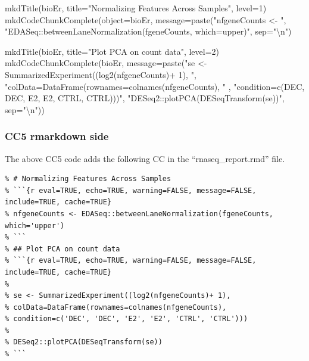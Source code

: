 \documentclass[
]{article}
\newenvironment{Shaded}{\begin{snugshade}}{\end{snugshade}}
\newcommand{\AttributeTok}[1]{\textcolor[rgb]{0.77,0.63,0.00}{#1}}
\newcommand{\DecValTok}[1]{\textcolor[rgb]{0.00,0.00,0.81}{#1}}
\newcommand{\FunctionTok}[1]{\textcolor[rgb]{0.00,0.00,0.00}{#1}}
\newcommand{\NormalTok}[1]{#1}
\newcommand{\SpecialCharTok}[1]{\textcolor[rgb]{0.00,0.00,0.00}{#1}}
\newcommand{\StringTok}[1]{\textcolor[rgb]{0.31,0.60,0.02}{#1}}
\begin{document}
\begin{Shaded}
\begin{Highlighting}[]
\FunctionTok{mkdTitle}\NormalTok{(bioEr, }\AttributeTok{title=}\StringTok{"Normalizing Features Across Samples"}\NormalTok{, }\AttributeTok{level=}\DecValTok{1}\NormalTok{)}
\FunctionTok{mkdCodeChunkComplete}\NormalTok{(}\AttributeTok{object=}\NormalTok{bioEr, }\AttributeTok{message=}\FunctionTok{paste}\NormalTok{(}\StringTok{"nfgeneCounts \textless{}{-} "}\NormalTok{,}
              \StringTok{"EDASeq::betweenLaneNormalization(fgeneCounts, which=\textquotesingle{}upper\textquotesingle{})"}\NormalTok{, }\AttributeTok{sep=}\StringTok{"}\SpecialCharTok{\textbackslash{}n}\StringTok{"}\NormalTok{)}

\FunctionTok{mkdTitle}\NormalTok{(bioEr, }\AttributeTok{title=}\StringTok{"Plot PCA on count data"}\NormalTok{, }\AttributeTok{level=}\DecValTok{2}\NormalTok{)}
\FunctionTok{mkdCodeChunkComplete}\NormalTok{(bioEr, }\AttributeTok{message=}\FunctionTok{paste}\NormalTok{(}\StringTok{"se \textless{}{-} SummarizedExperiment((log2(nfgeneCounts)+ 1), "}\NormalTok{,}
                \StringTok{"colData=DataFrame(rownames=colnames(nfgeneCounts), "}\NormalTok{ ,}
                \StringTok{"condition=c(\textquotesingle{}DEC\textquotesingle{}, \textquotesingle{}DEC\textquotesingle{}, \textquotesingle{}E2\textquotesingle{}, \textquotesingle{}E2\textquotesingle{}, \textquotesingle{}CTRL\textquotesingle{}, \textquotesingle{}CTRL\textquotesingle{})))"}\NormalTok{,}
                \StringTok{"DESeq2::plotPCA(DESeqTransform(se))"}\NormalTok{, }\AttributeTok{sep=}\StringTok{"}\SpecialCharTok{\textbackslash{}n}\StringTok{"}\NormalTok{))}
\end{Highlighting}
\end{Shaded}

\hypertarget{cc5-rmarkdown-side}{%
\subsubsection{CC5 rmarkdown side}\label{cc5-rmarkdown-side}}

The above CC5 code adds the following CC in the ``rnaseq\_report.rmd''
file.

\begin{verbatim}
% # Normalizing Features Across Samples
% ```{r eval=TRUE, echo=TRUE, warning=FALSE, message=FALSE, include=TRUE, cache=TRUE}
% nfgeneCounts <- EDASeq::betweenLaneNormalization(fgeneCounts, which='upper')
% ```
% ## Plot PCA on count data
% ```{r eval=TRUE, echo=TRUE, warning=FALSE, message=FALSE, include=TRUE, cache=TRUE}
% 
% se <- SummarizedExperiment((log2(nfgeneCounts)+ 1),
% colData=DataFrame(rownames=colnames(nfgeneCounts), 
% condition=c('DEC', 'DEC', 'E2', 'E2', 'CTRL', 'CTRL')))
% 
% DESeq2::plotPCA(DESeqTransform(se))
% ```
\end{verbatim}
\end{document}

